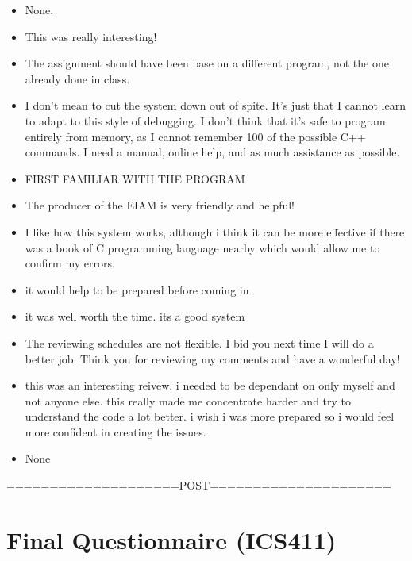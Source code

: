 \begin{enumerate}
\begin{itemize}
\item None.
\item This was really interesting!
\item The assignment should have been base on a different program, not the
one already done in class.
\item I don't mean to cut the system down out of spite.  It's just that I
cannot learn to adapt to this style of debugging.  I don't think that
it's safe to program entirely from memory, as I cannot remember 100%
of the possible C++ commands.  I need a manual, online help, and as
much assistance as possible.  
\item 
FIRST FAMILIAR WITH THE PROGRAM

\item The producer of the EIAM is very friendly and helpful!
\item I like how this system works, although i think it can be more
effective if there was a book of C programming language nearby
which would allow me to confirm my errors.
\item it would help to be prepared before coming in
\item it was well worth the time.  its a good system
\item The reviewing schedules are not flexible.  I bid you next time I will
do a better job.  Think you for reviewing my comments and have a
wonderful day!
\item this was an interesting reivew.  i needed to be dependant on only
myself and not anyone else.  this really made me concentrate harder and try
to understand the code a lot better.  i wish i was more prepared so i
would feel more confident in creating the issues.
\item None
\end{itemize}

\end{enumerate}

====================POST=====================

\chapter{Final Questionnaire (ICS411)}

